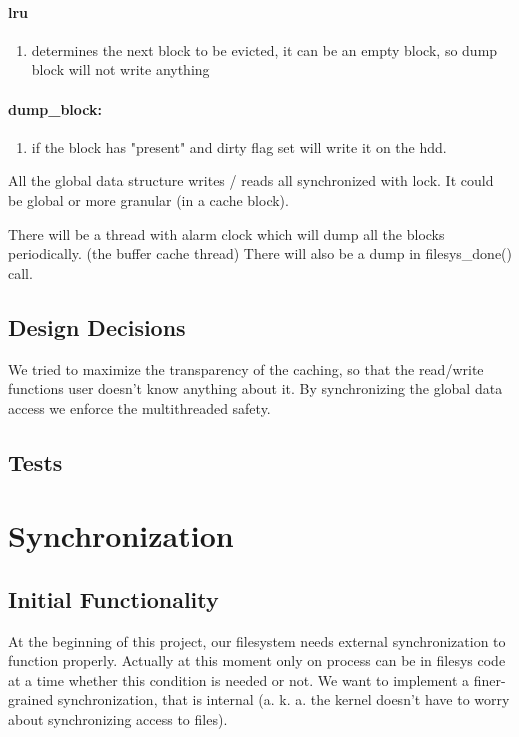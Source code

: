 \paragraph {lru}
\begin{enumerate}
	\item determines the next block to be evicted, it can be an empty block, so dump block will not write anything
\end{enumerate}

\paragraph {dump\_block:}
\begin{enumerate}
	\item if the block has "present" and dirty flag set will write it on the hdd.
\end{enumerate}

All the global data structure writes / reads all synchronized with lock. It could be global or more granular (in a cache block).

There will be a thread with alarm clock which will dump all the blocks periodically.  (the buffer cache thread)
There will also be a dump in  filesys\_done() call.




\subsection{Design Decisions}

We tried to maximize the transparency of the caching, so that the read/write functions user doesn't know anything about it. By synchronizing the global data access we enforce the multithreaded safety.


\subsection{Tests}


\section{Synchronization}
\subsection{Initial Functionality}

At the beginning of this project, our filesystem needs external synchronization to function properly. Actually at this moment only on process can be in filesys code at a time whether this condition is needed or not. We want to implement a finer-grained synchronization, that is internal (a. k. a. the kernel doesn't have to worry about synchronizing access to files).
  

